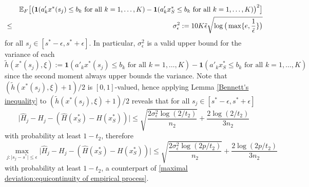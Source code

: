\documentclass[mnsc,blindrev]{informs4} %
\begin{document}
\begin{eqnarray}
    \notag&&\mathbb E_{F}\big[\big(\mathbf{1}(a'_kx^*(s_j)\leq b_k\text{ for all }k=1,\ldots,K)-\mathbf{1}(a'_kx^*_S\leq b_k\text{ for all }k=1,\ldots,K)\big)^2\big]\\
   &\leq& \sigma^2_{\epsilon}:=10K\tilde\epsilon\sqrt{\log\big(\max\{e,\frac{1}{\tilde \epsilon}\}\big)}\label{bound for local envelope CCP}
\end{eqnarray}
for all $s_j\in [s^*-\epsilon,s^*+\epsilon]$. In particular, $\sigma^2_{\epsilon}$ is a valid upper bound for the variance of each $\tilde h(x^*(s_j),\xi):=\mathbf{1}(a'_kx^*(s_j)\leq b_k\text{ for all }k=1,\ldots,K)-\mathbf{1}(a'_kx^*_S\leq b_k\text{ for all }k=1,\ldots,K)$ since the second moment always upper bounds the variance. Note that $(\tilde h(x^*(s_j),\xi)+1)/2$ is $[0,1]$-valued, hence applying Lemma \ref{Bennett's inequality} to $(\tilde h(x^*(s_j),\xi)+1)/2$ reveals that for all $s_j\in [s^*-\epsilon,s^*+\epsilon]$
\begin{equation*}
    \lvert\hat H_j-H_j-(\hat H(x^*_S)-H(x^*_S))\rvert\leq \sqrt{\frac{2\sigma^2_{\epsilon}\log(2/t_2)}{n_2}}+\frac{2\log(2/t_2)}{3n_2}
\end{equation*}
with probability at least $1-t_2$, therefore
\begin{equation}\label{equicontinuity of local empirical process CCP}
    \max_{j:\lvert s_j-s^*\rvert\leq \epsilon}\lvert\hat H_j-H_j-(\hat H(x^*_S)-H(x^*_S))\rvert\leq \sqrt{\frac{2\sigma^2_{\epsilon}\log(2p/t_2)}{n_2}}+\frac{2\log(2p/t_2)}{3n_2}
\end{equation}
with probability at least $1-t_2$, a counterpart of \eqref{maximal deviation:equicontinuity of empirical process}.
\end{document}
